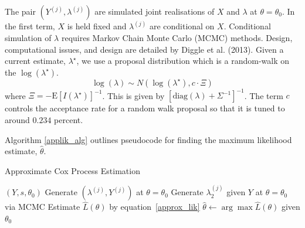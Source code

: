\documentclass{acm_proc_article-sp}
\begin{document}
The pair $(Y^{(j)}, \lambda^{(j)})$ are simulated joint realisations of $X$ and $\lambda$ at $\theta = \theta_0$.  In the first term, $X$ is held fixed and $\lambda^{(j)}$ are conditional on $X$.  Conditional simulation of $\lambda$ requires Markov Chain Monte Carlo (MCMC) methods.  Design, computational issues, and design are detailed by Diggle et al. (2013).  Given a current estimate, $\lambda^\star$, we use a proposal distribution which is a random-walk on the $\log (\lambda^\star)$.
\begin{equation*}
\log (\lambda) \sim N \left( \log \left( \lambda^\star\right) , c \cdot \Xi \right)
\end{equation*}
where $\Xi = - \text{E} \left[ I(\lambda^\star) \right]^{-1}$.  This is given by $\left[ \text{diag} \left( \lambda \right) + \Sigma^{-1} \right]^{-1}$.  The term $c$ controls the acceptance rate for a random walk proposal so that it is tuned to around $0.234$ percent.

Algorithm \ref{applik_alg} outlines pseudocode for finding the maximum likelihood estimate, $\hat{\theta}$.

\begin{algorithm}[!h]
\caption{Approximate Cox Process Estimation} \label{applik_alg}
\begin{algorithmic}
$(Y, s, \theta_0)$
\STATE Generate $(\lambda^{(j)}, Y^{(j)})$ at $\theta = \theta_0$
\STATE Generate $\lambda_2^{(j)}$ given $Y$ at $\theta = \theta_0$ via MCMC
\ENDFOR
\STATE Estimate $\hat{L} (\theta)$ by equation~\eqref{approx_lik}
\STATE $\hat{\theta} \gets \arg \max \hat{L} (\theta)$ given $\theta_0$
\end{algorithmic}
\end{algorithm}
\end{document}
